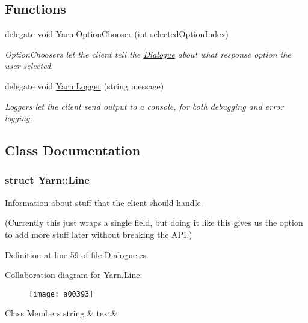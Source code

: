 \subsection*{Functions}
\begin{DoxyCompactItemize}
\item 
delegate void \hyperlink{a00053_a39866cbb03c03a35805d598b5d4ad553}{Yarn.\-Option\-Chooser} (int selected\-Option\-Index)
\begin{DoxyCompactList}\small\item\em Option\-Choosers let the client tell the \hyperlink{a00094}{Dialogue} about what response option the user selected. \end{DoxyCompactList}\item 
delegate void \hyperlink{a00053_a1e50031b945a3a2afafee6f590730568}{Yarn.\-Logger} (string message)
\begin{DoxyCompactList}\small\item\em Loggers let the client send output to a console, for both debugging and error logging. \end{DoxyCompactList}\end{DoxyCompactItemize}


\subsection{Class Documentation}
\label{a00380}
\hypertarget{a00053_a00380}{}
\subsubsection{struct Yarn\-:\-:Line}
Information about stuff that the client should handle. 

(Currently this just wraps a single field, but doing it like this gives us the option to add more stuff later without breaking the A\-P\-I.) 

Definition at line 59 of file Dialogue.\-cs.



Collaboration diagram for Yarn.\-Line\-:
\nopagebreak
\begin{figure}[H]
\begin{center}
\leavevmode
\texttt{[image: a00393]}
\end{center}
\end{figure}
\begin{DoxyFields}{Class Members}
\hypertarget{a00053_a81d1f04bbb4cf6642d2bd685bda1da20}{string}\label{a00053_a81d1f04bbb4cf6642d2bd685bda1da20}
&
text&
\\
\hline

\end{DoxyFields}
\label{a00383}
\hypertarget{a00053_a00383}{}
